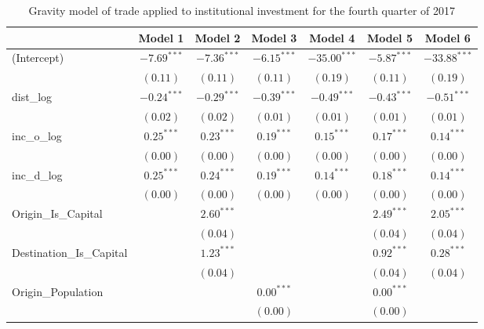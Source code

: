\begin{table}
	\begin{center}
		\small
		\caption[Gravity Model of Trade for Q4 2017]{Gravity model of trade applied to institutional investment for the fourth quarter of 2017}
		\begin{tabular}{l c c c c c c }
			\hline
			& Model 1 & Model 2 & Model 3 & Model 4 & Model 5 & Model 6 \\
			\hline
			(Intercept)                  & $-7.69^{***}$ & $-7.36^{***}$ & $-6.15^{***}$ & $-35.00^{***}$ & $-5.87^{***}$ & $-33.88^{***}$ \\
			& $(0.11)$      & $(0.11)$      & $(0.11)$      & $(0.19)$       & $(0.11)$      & $(0.19)$       \\
			dist\_log                    & $-0.24^{***}$ & $-0.29^{***}$ & $-0.39^{***}$ & $-0.49^{***}$  & $-0.43^{***}$ & $-0.51^{***}$  \\
			& $(0.02)$      & $(0.02)$      & $(0.01)$      & $(0.01)$       & $(0.01)$      & $(0.01)$       \\
			inc\_o\_log                  & $0.25^{***}$  & $0.23^{***}$  & $0.19^{***}$  & $0.15^{***}$   & $0.17^{***}$  & $0.14^{***}$   \\
			& $(0.00)$      & $(0.00)$      & $(0.00)$      & $(0.00)$       & $(0.00)$      & $(0.00)$       \\
			inc\_d\_log                  & $0.25^{***}$  & $0.24^{***}$  & $0.19^{***}$  & $0.14^{***}$   & $0.18^{***}$  & $0.14^{***}$   \\
			& $(0.00)$      & $(0.00)$      & $(0.00)$      & $(0.00)$       & $(0.00)$      & $(0.00)$       \\
			Origin\_Is\_Capital          &               & $2.60^{***}$  &               &                & $2.49^{***}$  & $2.05^{***}$   \\
			&               & $(0.04)$      &               &                & $(0.04)$      & $(0.04)$       \\
			Destination\_Is\_Capital     &               & $1.23^{***}$  &               &                & $0.92^{***}$  & $0.28^{***}$   \\
			&               & $(0.04)$      &               &                & $(0.04)$      & $(0.04)$       \\
			Origin\_Population           &               &               & $0.00^{***}$  &                & $0.00^{***}$  &                \\
			&               &               & $(0.00)$      &                & $(0.00)$      &                \\

\end{tabular}
\end{center}
\end{table}
